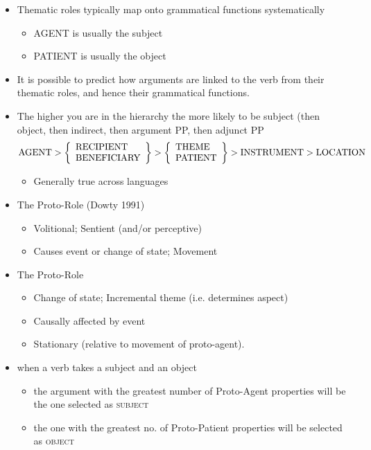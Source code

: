 \documentclass[headrule,footrule]{foils}
\begin{document}
\begin{itemize}
\item    Thematic roles typically map onto grammatical 
  functions systematically
  \begin{itemize}
  \item  AGENT is usually the subject
  \item  PATIENT is usually the object
  \end{itemize}
\item  It is possible to predict how arguments are linked to 
  the verb from their thematic roles, and hence their 
  grammatical functions.
\item {} The higher you are in the
  hierarchy the more likely to be subject (then object, then indirect,
  then argument PP, then adjunct PP
  \[  \mbox{AGENT} > 
  \left\{\begin{array}[c]{l} \mbox{RECIPIENT} \\ \mbox{BENEFICIARY} \end{array} \right\}  >
  \left\{\begin{array}[c]{l} \mbox{THEME} \\ \mbox{PATIENT} \end{array} \right\}  >
  \mbox{INSTRUMENT} > 
  \mbox{LOCATION} \]
  \begin{itemize}
  \item  Generally true across languages
  \end{itemize}
\end{itemize}


\begin{itemize}
\item  The  Proto-Role (Dowty 1991)
\begin{itemize}
\item  Volitional;  Sentient (and/or perceptive)
\item  Causes event or change of state;  Movement
\end{itemize}
\item  The  Proto-Role
\begin{itemize}
\item  Change of state; Incremental theme (i.e. determines aspect)
\item  Causally affected by event
\item  Stationary (relative to movement of proto-agent).     
\end{itemize}
\item   when a verb takes a subject and an object
  \begin{itemize}
  \item  the argument with the greatest number of Proto-Agent 
    properties will be the one selected as \textsc{subject}
  \item  the one with the greatest no. of Proto-Patient properties 
    will be selected as \textsc{object}
  \end{itemize}
\end{itemize}
\end{document}

